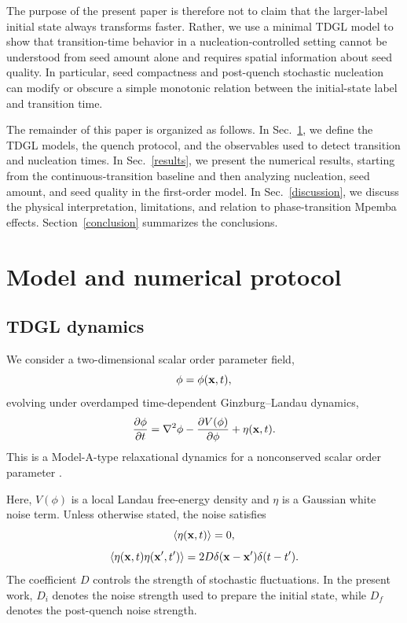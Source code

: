 ﻿\documentclass[aps,pre,preprint,showkeys,amsmath,amssymb,superscriptaddress,longbibliography]{revtex4-2}
\begin{document}
The purpose of the present paper is therefore not to claim that the larger-label initial state always transforms faster. Rather, we use a minimal TDGL model to show that transition-time behavior in a nucleation-controlled setting cannot be understood from seed amount alone and requires spatial information about seed quality. In particular, seed compactness and post-quench stochastic nucleation can modify or obscure a simple monotonic relation between the initial-state label and transition time.

The remainder of this paper is organized as follows. In Sec.~\ref{model-and-numerical-protocol}, we define the TDGL models, the quench protocol, and the observables used to detect transition and nucleation times. In Sec.~\ref{results}, we present the numerical results, starting from the continuous-transition baseline and then analyzing nucleation, seed amount, and seed quality in the first-order model. In Sec.~\ref{discussion}, we discuss the physical interpretation, limitations, and relation to phase-transition Mpemba effects. Section~\ref{conclusion} summarizes the conclusions.

\section{Model and numerical protocol}\label{model-and-numerical-protocol}

\subsection{TDGL dynamics}\label{tdgl-dynamics}

We consider a two-dimensional scalar order parameter field,
\begin{equation}
\phi=\phi({\bf x},t),
\end{equation}
evolving under overdamped time-dependent Ginzburg--Landau dynamics,
\begin{equation}
\frac{\partial \phi}{\partial t}=\nabla^2\phi-\frac{\partial V(\phi)}{\partial \phi}+\eta({\bf x},t).
\end{equation}
This is a Model-A-type relaxational dynamics for a nonconserved scalar order parameter \cite{Hohenberg1977,Bray1994,AllenCahn1979}.

Here, $V(\phi)$ is a local Landau free-energy density and $\eta$ is a Gaussian white noise term. Unless otherwise stated, the noise satisfies
\begin{equation}
\langle \eta({\bf x},t)\rangle=0,
\end{equation}
\begin{equation}
\langle \eta({\bf x},t)\eta({\bf x}',t')\rangle=2D\delta({\bf x}-{\bf x}')\delta(t-t').
\end{equation}
The coefficient $D$ controls the strength of stochastic fluctuations. In the present work, $D_i$ denotes the noise strength used to prepare the initial state, while $D_f$ denotes the post-quench noise strength.
\end{document}
